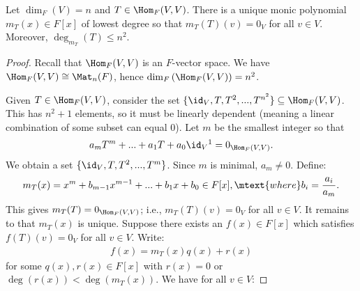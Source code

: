     \begin{theorem}
        Let $\dim_F{(V)} = n$ and $T \in \Hom_F{(V,V)}$. There is a unique monic polynomial $m_T(x) \in F[x]$ of lowest degree so that $m_T(T)(v) = 0_V$ for all $v \in V$. Moreover, $\deg_{m_T}{(T)}\leq n^2$.
    \end{theorem}
        \begin{proof}
            Recall that $\Hom_F{(V,V)}$ is an $F$-vector space. We have $\Hom_F{(V,V)} \cong \Mat_n{(F)}$, hence $\dim_F{(\Hom_F{(V,V)})} = n^2$.

            Given $T \in \Hom_F{(V,V)}$, consider the set $\{\id_V,T,T^2,...,T^{n^2}\} \subseteq \Hom_F{(V,V)}$. This has $n^2 + 1$ elements, so it must be linearly dependent (meaning a linear combination of some subset can equal $0$). Let $m$ be the smallest integer so that
                \begin{equation*}
                \begin{split}
                    a_mT^m + ... + a_1T + a_0 \id_V\footnotemark = 0_{\Hom_F{(V,V)}}.
                \end{split}
                \end{equation*}
            We obtain a set $\{\id_V,T,T^2,...,T^m\}$. Since $m$ is minimal, $a_m \neq 0$. Define:
                \begin{equation*}
                \begin{split}
                    m_T(x) = x^m + b_{m-1}x^{m-1} + ... + b_1x + b_0 \in F[x], \mtext{where} b_i = \frac{a_i}{a_m}.
                \end{split}
                \end{equation*}
            This gives $m_T(T) = 0_{\Hom_F{(V,V)}}$; i.e., $m_T(T)(v) = 0_V$ for all $v \in V$. 
                It remains to that $m_T(x)$ is unique. Suppose there exists an $f(x) \in F[x]$ which satisfies $f(T)(v) = 0_V$ for all $v \in V$. Write:
                    \begin{equation*}
                    \begin{split}
                        f(x) = m_T(x)q(x) + r(x)
                    \end{split}
                    \end{equation*}
                for some $q(x), r(x) \in F[x]$ with $r(x) = 0$ or $\deg{(r(x))} < \deg{(m_T(x))}$. We have for all $v \in V$:

\end{proof}
